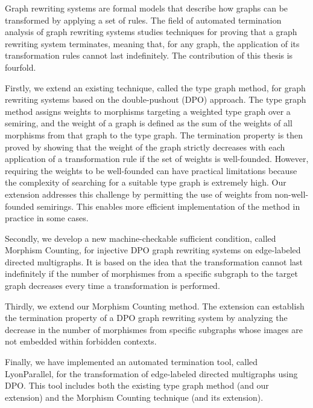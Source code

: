 Graph rewriting systems are formal models that describe how graphs can be transformed by applying a set of rules. The field of automated termination analysis of graph rewriting systems studies techniques for proving that a graph rewriting system terminates, meaning that, for any graph, the application of its transformation rules cannot last indefinitely. The contribution of this thesis is fourfold.

Firstly, we extend an existing technique, called the type graph method, for graph rewriting systems based on the double-pushout (DPO) approach. The type graph method assigns weights to morphisms targeting a weighted type graph over a semiring, and the weight of a graph is defined as the sum of the weights of all morphisms from that graph to the type graph. The termination property is then proved by showing that the weight of the graph strictly decreases with each application of a transformation rule if the set of weights is well-founded. 
However, requiring the weights to be well-founded can have practical limitations because the complexity of searching for a suitable type graph is extremely high.
Our extension addresses this challenge by permitting the use of weights from non-well-founded semirings.
This enables more efficient implementation of the method in practice in some cases.

Secondly, we develop a new machine-checkable sufficient condition, called Morphism Counting, for injective DPO graph rewriting systems on edge-labeled directed multigraphs. It is based on the idea that the transformation cannot last indefinitely if the number of morphismes from a specific subgraph to the target graph decreases every time a transformation is performed.

Thirdly, we extend our Morphism Counting method. The extension can establish the termination property of a DPO graph rewriting system by analyzing the decrease in the number of morphismes from specific subgraphs whose images are not embedded within forbidden contexts.

Finally, we have implemented an automated termination tool, called LyonParallel, 
for the transformation of edge-labeled directed multigraphs using DPO.
This tool includes both the existing type graph method (and our extension) and the Morphism Counting technique (and its extension).
